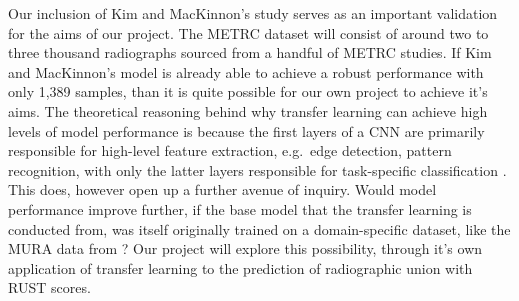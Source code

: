 Our inclusion of Kim and MacKinnon's study serves as an important validation for the aims of our project. The METRC dataset will consist of around two to three thousand radiographs sourced from a handful of METRC studies. If Kim and MacKinnon's model is already able to achieve a robust performance with only 1,389 samples, than it is quite possible for our own project to achieve it's aims. The theoretical reasoning behind why transfer learning can achieve high levels of model performance is because the first layers of a CNN are primarily responsible for high-level feature extraction, e.g.~edge detection, pattern recognition, with only the latter layers responsible for task-specific classification \autocite{Kim2018}. This does, however open up a further avenue of inquiry. Would model performance improve further, if the base model that the transfer learning is conducted from, was itself originally trained on a domain-specific dataset, like the MURA data from \autocite{MURA2017}? Our project will explore this possibility, through it's own application of transfer learning to the prediction of radiographic union with RUST scores.





